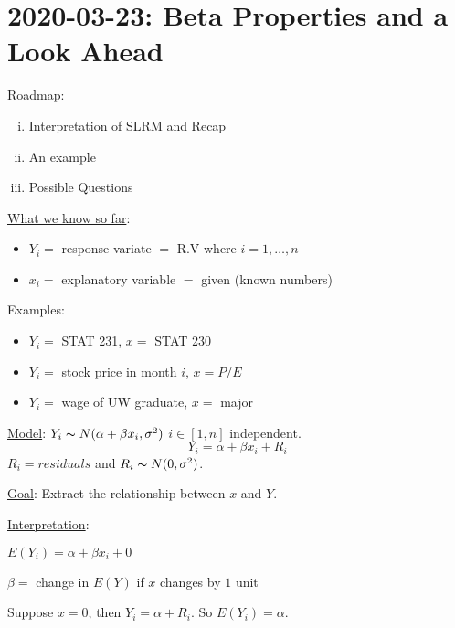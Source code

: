 \section{2020-03-23: Beta Properties and a Look Ahead}
\underline{Roadmap}:
\begin{enumerate}[(i)]
    \item Interpretation of SLRM and Recap
    \item An example
    \item Possible Questions
\end{enumerate}
\underline{What we know so far}:
\begin{itemize}
    \item $ Y_i = $ response variate $ = $ R.V where $ i=1,\ldots ,n $
    \item $ x_i = $ explanatory variable $ = $ given (known numbers)
\end{itemize}
Examples:
\begin{itemize}
    \item $ Y_i = $ STAT 231, $ x= $ STAT 230
    \item $ Y_i= $ stock price in month $ i $, $ x=P/E $
    \item $ Y_i= $ wage of UW graduate, $ x= $ major
\end{itemize}

\underline{Model}: $ Y_i  \thicksim N(\alpha+\beta x_i, \sigma^2) $ $ i\in[1,n] $ independent.
\[ Y_i=\alpha+\beta x_i+R_i \]
$ R_i = residuals $ and $ R_i \thicksim N(0,\sigma^2) $.

\underline{Goal}: Extract the relationship between $ x $ and $ Y $.

\underline{Interpretation}:

$ E(Y_i)=\alpha+\beta x_i+0 $

$ \beta = $ change in $ E(Y) $ if $ x $ changes by $ 1 $ unit

Suppose $ x=0 $, then $ Y_i=\alpha+R_i $. So $ E(Y_i)=\alpha $.

